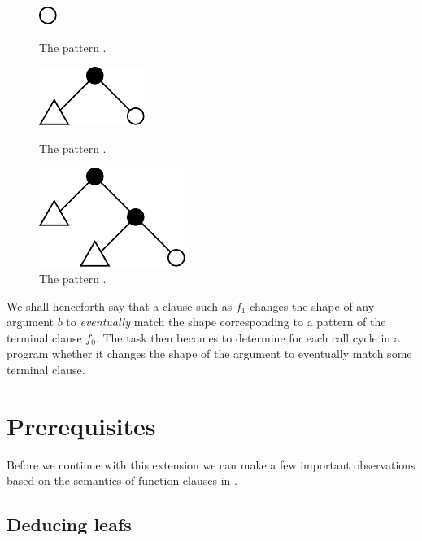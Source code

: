 \begin{figure}[htbp!]
\begin{minipage}{0.3\linewidth}
\centering
\includegraphics{figures/size-change-fail-f1-0}
\caption[]{The pattern .}
\label{figure:size-change-fail-f1-0}
\end{minipage}
\begin{minipage}{0.3\linewidth}
\centering
\includegraphics{figures/size-change-fail-f1-1}
\caption[]{The pattern .}
\label{figure:size-change-fail-f1-1}
\end{minipage}
\begin{minipage}{0.3\linewidth}
\centering
\includegraphics{figures/size-change-fail-f1-2}
\caption[]{The pattern .}
\label{figure:size-change-fail-f1-2}
\end{minipage}
\end{figure}

We shall henceforth say that a clause such as $f_1$ changes the shape of any
argument $b$ to \emph{eventually} match the shape corresponding to a pattern of
the terminal clause $f_0$. The task then becomes to determine for each call
cycle in a program whether it changes the shape of the argument to eventually
match some terminal clause.

\section{Prerequisites}

Before we continue with this extension we can make a few important observations
based on the semantics of function clauses in \D{}.

\subsection{Deducing leafs}\label{section:extend-deducing-zero}

